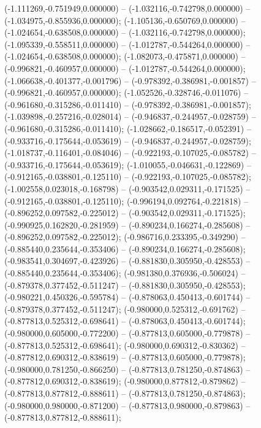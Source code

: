  (-1.111269,-0.751949,0.000000) -- (-1.032116,-0.742798,0.000000) -- (-1.034975,-0.855936,0.000000);
 (-1.105136,-0.650769,0.000000) -- (-1.024654,-0.638508,0.000000) -- (-1.032116,-0.742798,0.000000);
 (-1.095339,-0.558511,0.000000) -- (-1.012787,-0.544264,0.000000) -- (-1.024654,-0.638508,0.000000);
 (-1.082073,-0.475871,0.000000) -- (-0.996821,-0.460957,0.000000) -- (-1.012787,-0.544264,0.000000);
 (-1.066638,-0.401377,-0.001796) -- (-0.978392,-0.386981,-0.001857) -- (-0.996821,-0.460957,0.000000);
 (-1.052526,-0.328746,-0.011076) -- (-0.961680,-0.315286,-0.011410) -- (-0.978392,-0.386981,-0.001857);
 (-1.039898,-0.257216,-0.028014) -- (-0.946837,-0.244957,-0.028759) -- (-0.961680,-0.315286,-0.011410);
 (-1.028662,-0.186517,-0.052391) -- (-0.933716,-0.175644,-0.053619) -- (-0.946837,-0.244957,-0.028759);
 (-1.018737,-0.116401,-0.084046) -- (-0.922193,-0.107025,-0.085782) -- (-0.933716,-0.175644,-0.053619);
 (-1.010055,-0.046631,-0.122869) -- (-0.912165,-0.038801,-0.125110) -- (-0.922193,-0.107025,-0.085782);
 (-1.002558,0.023018,-0.168798) -- (-0.903542,0.029311,-0.171525) -- (-0.912165,-0.038801,-0.125110);
 (-0.996194,0.092764,-0.221818) -- (-0.896252,0.097582,-0.225012) -- (-0.903542,0.029311,-0.171525);
 (-0.990925,0.162820,-0.281959) -- (-0.890234,0.166274,-0.285608) -- (-0.896252,0.097582,-0.225012);
 (-0.986716,0.233395,-0.349290) -- (-0.885440,0.235644,-0.353406) -- (-0.890234,0.166274,-0.285608);
 (-0.983541,0.304697,-0.423926) -- (-0.881830,0.305950,-0.428553) -- (-0.885440,0.235644,-0.353406);
 (-0.981380,0.376936,-0.506024) -- (-0.879378,0.377452,-0.511247) -- (-0.881830,0.305950,-0.428553);
 (-0.980221,0.450326,-0.595784) -- (-0.878063,0.450413,-0.601744) -- (-0.879378,0.377452,-0.511247);
 (-0.980000,0.525312,-0.691762) -- (-0.877813,0.525312,-0.698641) -- (-0.878063,0.450413,-0.601744);
 (-0.980000,0.605000,-0.772200) -- (-0.877813,0.605000,-0.779878) -- (-0.877813,0.525312,-0.698641);
 (-0.980000,0.690312,-0.830362) -- (-0.877812,0.690312,-0.838619) -- (-0.877813,0.605000,-0.779878);
 (-0.980000,0.781250,-0.866250) -- (-0.877813,0.781250,-0.874863) -- (-0.877812,0.690312,-0.838619);
 (-0.980000,0.877812,-0.879862) -- (-0.877813,0.877812,-0.888611) -- (-0.877813,0.781250,-0.874863);
 (-0.980000,0.980000,-0.871200) -- (-0.877813,0.980000,-0.879863) -- (-0.877813,0.877812,-0.888611);
